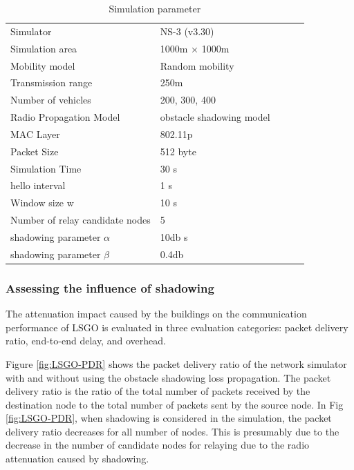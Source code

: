 \documentclass[conference]{IEEEtran}
\begin{document}
\begin{table}[!ht]
\begin{center}
\caption{Simulation parameter}
\label{tab:parameter}
\begin{tabular}{|l|l|lll}
\cline{1-2}
Simulator    & NS-3 (v3.30) &  &  &  \\ \cline{1-2}
Simulation area    & 1000m × 1000m   &  &  &  \\ \cline{1-2}
Mobility model     & Random mobility &  &  &  \\ \cline{1-2}
Transmission range & 250m            &  &  &  \\ \cline{1-2}
Number of vehicles & 200, 300, 400      &  &  &  \\ \cline{1-2}
Radio Propagation Model    & obstacle shadowing model\cite{20}&  &  &  \\ \cline{1-2}
MAC Layer     & 802.11p &  &  &  \\ \cline{1-2}
Packet Size & 512 byte       &  &  &  \\ \cline{1-2}
Simulation Time & 30 s      &  &  &  \\ \cline{1-2}
hello interval & 1 s      &  &  &  \\ \cline{1-2}
Window size w  & 10 s      &  &  &  \\ \cline{1-2}
Number of relay candidate nodes  & 5      &  &  &  \\ \cline{1-2}
shadowing parameter $\alpha$  & 10db s      &  &  &  \\ \cline{1-2}
shadowing parameter $\beta$    & 0.4db &  &  \\ \cline{1-2}
\end{tabular}
\end{center}
\end{table}


\subsubsection{Assessing the influence of shadowing}
The attenuation impact caused by the buildings on the communication performance of LSGO is evaluated in three evaluation categories: packet delivery ratio, end-to-end delay, and overhead.  

Figure \ref{fig:LSGO-PDR} shows the packet delivery ratio of the network simulator with and without using the obstacle shadowing loss propagation. 
The packet delivery ratio is the ratio of the total number of packets received by the destination node to the total number of packets sent by the source node.
In Fig \ref{fig:LSGO-PDR}, when shadowing is considered in the simulation, the packet delivery ratio decreases for all number of nodes. This is presumably due to the decrease in the number of candidate nodes for relaying due to the radio attenuation caused by shadowing.
\end{document}
